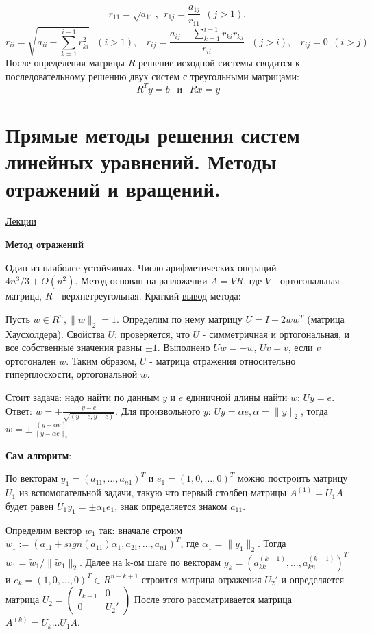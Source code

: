 \documentclass[specialist, subf, href, colorlinks=true, 12pt, times, mtpro, final]{disser}
\theoremstyle{definition}
\begin{document}
{    $$
    r_{11} = \sqrt{a_{11}}, \ \ r_{1j} = \frac{a_{1j}}{r_{11}} \ \ (j > 1),
    $$
    $$
    r_{ii} = \sqrt{a_{ii} - \sum \limits_{k=1}^{i-1} r^2_{ki}} \ \ \ (i > 1),  \ \ \ \    r_{ij} = \frac{a_{ij} - \sum \limits_{k = 1}^{i-1} r_{ki} r_{kj}}{r_{ii}} \ \ \ (j > i), \ \ \ \ r_{ij} = 0 \ \ (i > j)
    $$
    После определения матрицы $R$ решение исходной системы сводится к последовательному решению двух систем с треугольными матрицами:
    $$
    R^Ty = b \ \ \text{ и } \ \  Rx = y 
    $$
\section {Прямые методы решения систем линейных уравнений. Методы отражений и вращений.}
	\hyperlink {lects.54}{Лекции}\\
	\begin{center} \textbf{Метод отражений} \end{center}
	Один из наиболее устойчивых.
	Число арифметических операций - $4n^3/3 + O(n^2)$. Метод основан на разложении $A = VR$, где $V$ - ортогональная матрица, $R$ - верхнетреугольная.
	Краткий \hyperlink {lects.54}{вывод} метода:

	Пусть $w \in R^n, \|w\|_2 = 1$. Определим по нему матрицу $U = I - 2ww^T$ (матрица Хаусхолдера). 
	Свойства $U$: проверяется, что $U$ - симметричная и ортогональная, и все собственные значения равны $\pm1$. Выполнено $Uw = -w$, $Uv = v$, если $v$ ортогонален $w$.
	Таким образом, $U$ - матрица отражения относительно гиперплоскости, ортогональной $w$.
	
	Стоит задача: надо найти по данным $y$ и $e$ единичной длины найти $w$: $Uy = e$. Ответ: $w = \pm \frac{y-e}{\sqrt{(y-e,y-e)}}$.
	Для произвольного $y$: $Uy = \alpha e, \alpha = \|y\|_2$, тогда $w = \pm \frac{(y - \alpha e)}{\|y-\alpha e\|_2}$
	 
	{\bf Сам алгоритм}:

	По векторам $y_1 = (a_{11}, \dots, a_{n1})^T$ и $e_1 = (1, 0, \dots, 0)^T$ можно построить матрицу $U_1$ из вспомогательной задачи, такую что первый столбец матрицы $A^{(1)} = U_1 A$ будет равен
	$U_1y_1 = \pm \alpha_1 e_1$, знак определяется знаком  $a_{11}$.

	 Определим вектор $w_1$ так: вначале строим $\widetilde{w}_1 := (a_{11} + sign(a_{11})\alpha_1, a_{21}, \dots, a_{n1})^T$, где $\alpha_1 = \|y_1\|_2$. Тогда $w_1 = \widetilde{w}_1 / \|\widetilde{w}_1\|_2$.
	Далее на k-ом шаге по векторам $y_k = (a_{kk}^{(k-1)}, \dots, a_{kn}^{(k-1)})^T$ и $e_k = (1, 0, \dots, 0)^T \in R^{n-k+1}$ строится матрица отражения $U_2'$ и определяется матрица 
	$U_2 = \left(
	\begin{array}{cc}
		I_{k-1} & 0 \\
		0 & U_2'
		\end{array}
		\right)$
	После этого рассматривается матрица $A^{(k)} = U_k \dots U_1 A$.

}
\end{document}
